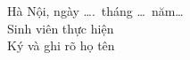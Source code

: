 \vspace{1cm}


\begin{flushright}
    \begin{minipage}{0.35\textwidth}
        \centering
        Hà Nội, ngày \dots.\ tháng \dots\ năm\dots\\[12pt]
        {\fontsize{13}{16}\selectfont Sinh viên thực hiện}\\[20pt]
        {\fontsize{10}{12}\selectfont Ký và ghi rõ họ tên}
    \end{minipage}
\end{flushright}

\newpage
